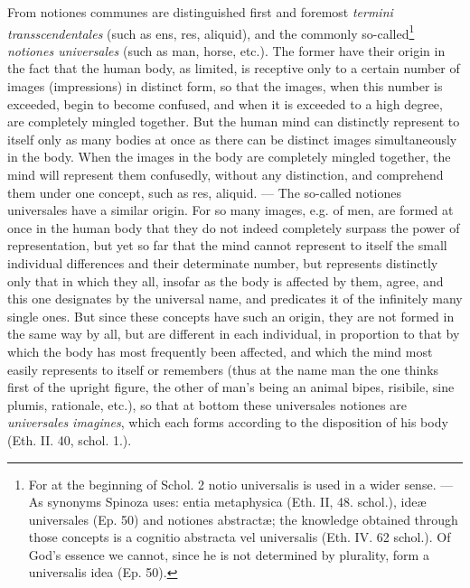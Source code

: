 \documentclass[12pt,a4paper,openany]{book}
\newcommand{\opage}[1]{\marginnote{\footnotesize\textit{[#1]}}}
\begin{document}
From notiones communes are distinguished first and foremost \emph{termini
transscendentales} (such as ens, res, aliquid), and
\opage{98}\setcounter{footnote}{0}the commonly so-called\footnote{For at the beginning of Schol. 2
notio universalis is used in a wider sense. --- As
synonyms Spinoza uses: entia metaphysica (Eth. II, 48. schol.),
ideæ universales (Ep. 50) and notiones abstractæ; the knowledge obtained through those
concepts is a cognitio abstracta vel
universalis (Eth. IV. 62 schol.). Of God's essence we cannot, since he
is not determined by plurality, form a universalis idea (Ep.
50).} \emph{notiones universales} (such as man, horse, etc.). The former have
their origin in the fact that the human body, as limited,
is receptive only to a certain number of images (impressions) in distinct
form, so that the images, when this number is exceeded, begin
to become confused, and when it is exceeded to a high degree, are completely
mingled together. But the human mind can distinctly represent
to itself only as many bodies at once as there can be distinct images
simultaneously in the body. When the images in the body are completely
mingled together, the mind will represent them confusedly, without any
distinction, and comprehend them under one concept, such as res, aliquid.
--- The so-called notiones universales have a similar origin.
For so many images, e.g. of men, are formed at once in the human body
that they do not indeed completely surpass the power of
representation, but yet so far that the mind cannot
represent to itself the small individual differences and their determinate
number, but represents distinctly only that in which they all,
insofar as the body is affected by them, agree, and this
one designates by the universal name, and predicates it of the
infinitely many single ones. But since these concepts have such an
origin, they are not formed in the same way by all, but are
different in each individual, in proportion to that by which the body
has most frequently been affected, and which the mind most easily represents to itself
or remembers (thus at the name man the one thinks first
of the upright figure, the other of man's being an animal
bipes, risibile, sine plumis, rationale, etc.),
\opage{99}\setcounter{footnote}{0}so that at bottom these universales notiones are \emph{universales
imagines}, which each forms according to the disposition of his body (Eth. II.
40, schol. 1.).
\end{document}

